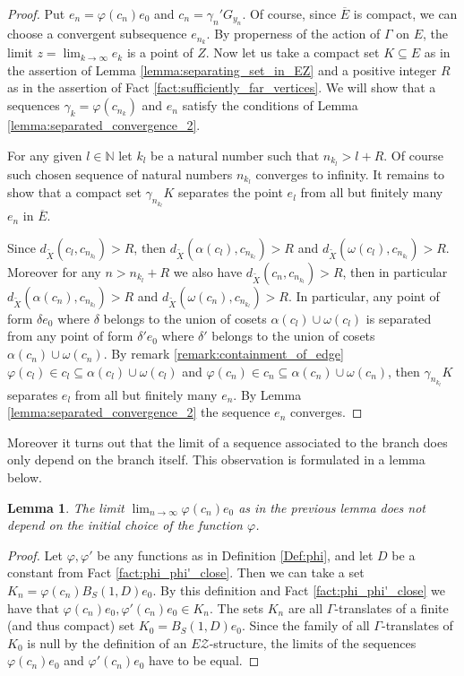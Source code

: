 \documentclass[12pt, a4paper]{article}
\newcommand{\NN}{\mathbb{N}} \newcommand{\ZZ}{\mathbb{Z}}
\newcommand{\8}{\infty}
\theoremstyle{break}
\newtheorem{lm}[thm]{Lemma}
\theoremstyle{defbreak}
\newcommand{\ol}[1]{\overline{#1}}
\newcommand{\wtl}[1]{\widetilde{#1}}
\begin{document}
\begin{proof}
    Put $e_n = \varphi(c_n)e_0$ and $c_n = \gamma_n'G_{y_n}$. Of course, since $\ol{E}$ is compact, we can choose a convergent subsequence $e_{n_k}$. By properness of the action of $\Gamma$ on $E$,
    the limit $z = \lim_{k\to\8}e_{k}$ is a point of $Z$. Now let us take a compact set $K \subseteq E$ as in the assertion of Lemma \ref{lemma:separating_set_in_EZ} and a positive integer $R$ as in the assertion of Fact \ref{fact:sufficiently_far_vertices}. We will show that a sequences $\gamma_k = \varphi(c_{n_k})$ and $e_n$ satisfy the conditions of Lemma \ref{lemma:separated_convergence_2}.

    For any given $l\in \NN$ let $k_l$ be a natural number such that  $n_{k_l} > l + R$. Of course such chosen sequence of natural numbers $n_{k_l}$ converges to infinity. It remains to show that a compact set $\gamma_{n_{k_l}}K$ separates the point $e_l$ from all but finitely many $e_n$ in $\ol{E}$.

    Since $d_{\wtl{X}}(c_l,c_{n_{k_l}}) > R$, then $d_{\wtl{X}}(\alpha(c_l),c_{n_{k_l}}) > R$ and $d_{\wtl{X}}(\omega(c_l),c_{n_{k_l}}) > R$. Moreover for any $n > n_{k_l} + R$ we also have $d_{\wtl{X}}(c_n,c_{n_{k_l}}) > R$, then in particular $d_{\wtl{X}}(\alpha(c_n),c_{n_{k_l}}) > R$ and $d_{\wtl{X}}(\omega(c_n),c_{n_{k_l}}) > R$. In particular, any point of form $\delta e_0$ where $\delta$ belongs to the union of cosets $\alpha(c_l)\cup \omega(c_l)$ is separated from any point of form $\delta' e_0$ where $\delta'$ belongs to the union of cosets $\alpha(c_n)\cup \omega(c_n)$. By remark \ref{remark:containment_of_edge} $\varphi(c_l) \in c_l \subseteq \alpha(c_l) \cup \omega(c_l)$ and $\varphi(c_n) \in c_n \subseteq \alpha(c_n) \cup \omega(c_n)$, then $\gamma_{n_{k_l}}K$ separates $e_l$ from all but finitely many $e_n$. By Lemma \ref{lemma:separated_convergence_2} the sequence $e_n$ converges.
\end{proof}

Moreover it turns out that the limit of a sequence associated to the branch does only depend on the branch itself. This observation is formulated in a lemma below.\medskip

\begin{lm}
    The limit $\lim_{n\to \8} \varphi(c_n)e_0$ as in the previous lemma does not depend on the initial choice of the function $\varphi$.
\end{lm}

\begin{proof}
    Let $\varphi, \varphi'$ be any functions as in Definition \ref{Def:phi}, and let $D$ be a constant from Fact \ref{fact:phi_phi'_close}. Then we can take a set $K_n = \varphi(c_n)B_S(1,D)e_0$. By this definition and Fact \ref{fact:phi_phi'_close} we have that $\varphi(c_n)e_0, \varphi'(c_n)e_0\in K_n$. The sets $K_n$ are all $\Gamma$-translates of a finite (and thus compact) set $K_0 = B_S(1,D)e_0$. Since the family of all $\Gamma$-translates of $K_0$ is null by the definition of an $E\mathcal{Z}$-structure, the limits of the sequences $\varphi(c_n)e_0$ and $\varphi'(c_n)e_0$ have to be equal.
\end{proof}
\end{document}
